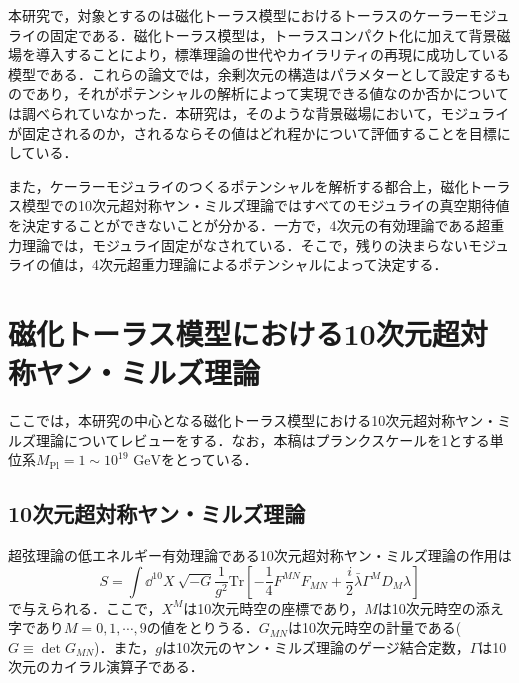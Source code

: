 \documentclass[a4paper,uplatex,dvipdfmx]{jsarticle}
\theoremstyle{definition}
\begin{document}
本研究で，対象とするのは磁化トーラス模型におけるトーラスのケーラーモジュライの固定である．磁化トーラス模型は，トーラスコンパクト化に加えて背景磁場を導入することにより，標準理論の世代やカイラリティの再現に成功している模型である\cite{Cremades_ComputingYukawa_2004a,Abe_SuperfieldDescription_2012,Abe_AhlerModuli_2017}．これらの論文では，余剰次元の構造はパラメターとして設定するものであり，それがポテンシャルの解析によって実現できる値なのか否かについては調べられていなかった．本研究は，そのような背景磁場において，モジュライが固定されるのか，されるならその値はどれ程かについて評価することを目標にしている．

また，ケーラーモジュライのつくるポテンシャルを解析する都合上，磁化トーラス模型での10次元超対称ヤン・ミルズ理論ではすべてのモジュライの真空期待値を決定することができないことが分かる．一方で，4次元の有効理論である超重力理論では，モジュライ固定がなされている\cite{Abe_ModuliStabilization_2007a,Abe_MoreFterm_2007a,Abe_AhlerModuli_2017}．そこで，残りの決まらないモジュライの値は，4次元超重力理論によるポテンシャルによって決定する．


\section{磁化トーラス模型における10次元超対称ヤン・ミルズ理論}

ここでは，本研究の中心となる磁化トーラス模型における10次元超対称ヤン・ミルズ理論についてレビューをする．なお，本稿はプランクスケールを1とする単位系$M_{\text{Pl}}=1\sim 10^{19}\text{\ GeV}$をとっている．


\subsection{10次元超対称ヤン・ミルズ理論}

超弦理論の低エネルギー有効理論である10次元超対称ヤン・ミルズ理論の作用は
\begin{equation}
   S
   =
   \int
   \dd^{10}X\ 
   \sqrt{-G}\frac{1}{g^2}
   \text{Tr}
   \left[  
      -
      \frac{1}{4}F^{MN}F_{MN}
      +
      \frac{i}{2}
      \bar{\lambda}\Gamma^{M}D_{M}\lambda
   \right]
   \label{action_10DSYM}
\end{equation}
で与えられる．ここで，$X^{M}$は10次元時空の座標であり，$M$は10次元時空の添え字であり$M=0,1,\cdots,9$の値をとりうる．$G_{MN}$は10次元時空の計量である($G\equiv\det G_{MN}$)．また，$g$は10次元のヤン・ミルズ理論のゲージ結合定数，$\Gamma$は10次元のカイラル演算子である．
\end{document}
